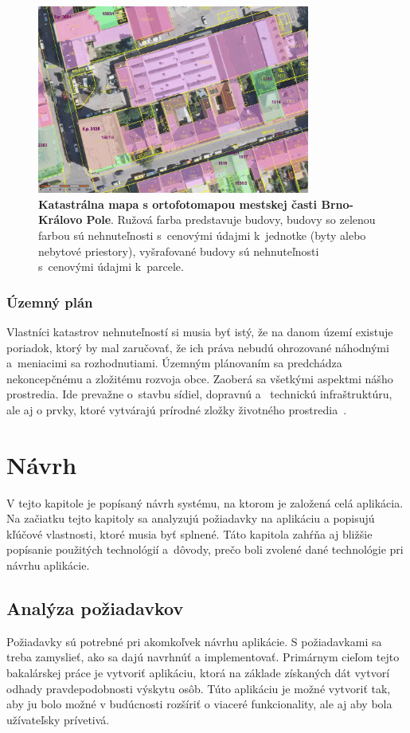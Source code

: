 \begin{figure}[ht]
    \centering
    \includegraphics[width=0.8\textwidth]{obrazky-figures/katastr-ortofo-kralovopole.jpg}
    \caption{\textbf{Katastrálna mapa s ortofotomapou mestskej časti Brno-Královo Pole}. Ružová farba predstavuje budovy, budovy so zelenou farbou sú nehnuteľnosti s~cenovými údajmi k~jednotke (byty alebo nebytové priestory), vyšrafované budovy sú nehnuteľnosti s~cenovými údajmi k~parcele.}
    \label{fig:katastrmapa}
\end{figure}

\subsection{Územný plán}
Vlastníci katastrov nehnuteľností si musia byť istý, že na danom území existuje poriadok, ktorý by mal zaručovať, že ich práva nebudú ohrozované náhodnými a~meniacimi sa rozhodnutiami. Územným plánovaním sa predchádza nekoncepčnému a zložitému rozvoja obce. Zaoberá sa všetkými aspektmi nášho prostredia. Ide prevažne o~stavbu sídiel, dopravnú a~ technickú infraštruktúru, ale aj o prvky, ktoré vytvárajú prírodné zložky životného prostredia~\cite{uzemnyplan}.



\chapter{Návrh}
\label{navrh}
V tejto kapitole je popísaný návrh systému, na ktorom je založená celá aplikácia. Na začiatku tejto kapitoly sa analyzujú požiadavky na aplikáciu a popisujú kľúčové vlastnosti, ktoré musia byť splnené. Táto kapitola zahŕňa aj bližšie popísanie použitých technológií a~dôvody, prečo boli zvolené dané technológie pri návrhu aplikácie.


\section{Analýza požiadavkov}
\label{sec:analysis}
Požiadavky sú potrebné pri akomkoľvek návrhu aplikácie. S požiadavkami sa treba zamyslieť, ako sa dajú navrhnúť a implementovať. Primárnym cieľom tejto bakalárskej práce je vytvoriť aplikáciu, ktorá na základe získaných dát vytvorí odhady pravdepodobnosti výskytu osôb. Túto aplikáciu je možné vytvoriť tak, aby ju bolo možné v budúcnosti rozšíriť o viaceré funkcionality, ale aj aby bola užívateľsky prívetivá.

